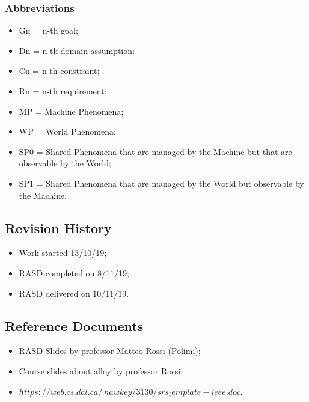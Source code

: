 \documentclass[titlepage]{article}
\begin{document}
\subsubsection{Abbreviations}

\begin{itemize}

	\item Gn = n-th goal;
	\item Dn = n-th domain assumption;
	\item Cn = n-th constraint;
	\item Rn = n-th requirement;
	\item MP = Machine Phenomena;
	\item WP = World Phenomena;
	\item SP0 = Shared Phenomena that are managed by the Machine but that are observable by the World;
	\item SP1 = Shared Phenomena that are managed by the World but observable by the Machine.

\end{itemize}


\subsection{Revision History}

\begin{itemize}

	\item Work started 13/10/19;
	\item RASD completed on 8/11/19;
	\item RASD delivered on 10/11/19.

\end{itemize}

\subsection{Reference Documents}
\begin{itemize}
	\item RASD Slides by professor Matteo Rossi (Polimi);
	\item Course slides about alloy by professor Rossi;
	\item $https://web.cs.dal.ca/~hawkey/3130/srs_template-ieee.doc.$
	
\end{itemize}
\end{document}
